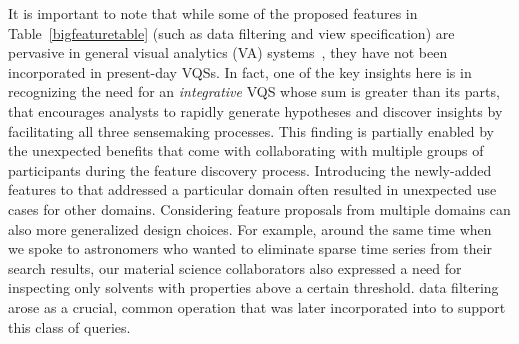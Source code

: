  \par It is important to note that while some of the proposed features in Table~\ref{bigfeaturetable} (such as data filtering and view specification) are pervasive in general visual analytics (VA) systems~\cite{Heer2012,Amar2005}, they have not been incorporated in present-day VQSs. In fact, one of the key insights here is in recognizing the need for an \emph{integrative} VQS whose sum is greater than its parts, that encourages analysts to rapidly generate hypotheses and discover insights by facilitating all three sensemaking processes. This finding is partially enabled by the unexpected benefits that come with collaborating with multiple groups of participants during the feature discovery process. 
 \npar Introducing the newly-added features to \zvpp that addressed a particular domain often resulted in unexpected use cases for other domains. Considering feature proposals from multiple domains can also  more generalized design choices. For example, around the same time when we spoke to astronomers who wanted to eliminate sparse time series from their search results, our material science collaborators also expressed a need for inspecting only solvents with properties above a certain threshold.  data filtering arose as a crucial, common operation that was later incorporated into \zvpp to support this class of queries. %
